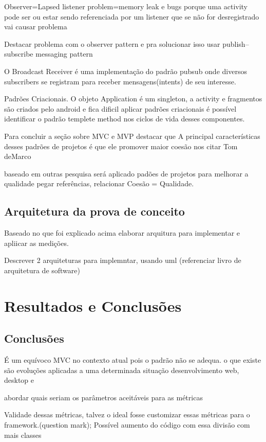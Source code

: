 Observer=Lapsed listener problem=memory leak e bugs porque uma activity pode ser
ou estar sendo referenciada por um listener que se não for desregistrado vai
causar problema

Destacar problema com o observer pattern e pra solucionar isso
usar publish–subscribe messaging pattern

O Broadcast Receiver é uma implementação do padrão pubsub onde diversos
subscribers se registram para receber mensagens(intents) de seu interesse.


Padrões Criacionais. O objeto Application é um singleton, a activity e
fragmentos são criados pelo android e fica dificil aplicar padrões criacionais é
possível identificar o padrão templete method nos ciclos de vida desses
componentes.



 Para concluir a seção sobre MVC e MVP destacar que A principal características
 desses padrões de projetos é que ele promover maior coesão nos citar Tom deMarco 

baseado em outras pesquisa será aplicado padões de projetos  para melhorar a
 qualidade pegar referências,  relacionar Coesão = Qualidade.

\section{Arquitetura da prova de conceito}

Baseado no que foi explicado acima elaborar arquitura para implementar e
apliicar as medições.

Descrever 2 arquiteturas para implemntar, usando uml (referenciar livro de
arquitetura de software)
\fi
\chapter{Resultados e Conclusões}

\section{Conclusões}

É um equívoco MVC no contexto atual pois o padrão não se adequa. o que existe
são evoluções aplicadas a uma determinada situação desenvolvimento web, desktop
e 

abordar quais seriam os parâmetros aceitáveis para as métricas

Validade dessas métricas, talvez o ideal fosse customizar essas métricas para o
framework.(question mark);
Possível aumento do código com essa divisão com mais classes

